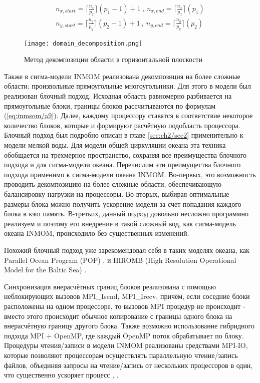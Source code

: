     \begin{equation} \label{eq:inmsom/a9} 
    \begin{array}{c} 
    \displaystyle{ n_{x, start} = \lceil \frac{n_x}{p_x} \rceil (p_1 - 1) + 1 ~,~ n_{x, end} =  \lceil \frac{n_x}{p_x} \rceil (p_1) } \\	
    
    \displaystyle{ n_{y, start} = \lceil \frac{n_y}{p_y} \rceil (p_2 - 1) + 1 ~,~ n_{y, end} =  \lceil \frac{n_y}{p_y} \rceil (p_2) }
    \end{array}
    \end{equation} 
    
	\begin{figure}[htb!]
	\center
	\texttt{[image: domain\_decomposition.png]}
	\caption{Метод декомпозиции области в горизонтальной плоскости}
	\label{fig:ddm3d}
	\end{figure}
        
    Также в сигма-модели INMOM реализована декомпозиция на более сложные области: произвольные прямоугольные многоугольники. 
    Для этого в модели был реализован блочный подход.
    Исходная область равномерно разбивается на прямоугольные блоки, границы блоков рассчитываются по формулам (\ref{eq:inmsom/a9}). 
    Далее, каждому процессору ставятся в соответствие некоторое количество блоков, которые и формируют расчётную подобласть процессора. 
    Блочный подход был подробно описан в главе \ref{sec:ch2/sec2} применительно к модели мелкой воды. Для модели общей циркуляции океана эта техника обобщается на трехмерное пространство, сохраняя все преимущества блочного подхода и для сигма-модели океана. 		
    Перечислим эти преимущества блочного подхода применимо к сигма-модели океана INMOM.
    Во-первых, это возможность проводить декомпозицию на более сложные области, обеспечивающую балансировку нагрузки на процессоры. 
    Во-вторых, выбирая оптимальные размеры блока можно получить ускорение модели за счет попадания каждого блока в кэш память.
    В-третьих, данный подход довольно несложно программно реализуем и поэтому его внедрение в такой сложный код, как сигма-модель океана INMOM, происходило 
    без существенных изменений.

    Похожий блочный подход уже зарекомендовал себя в таких моделях океана, как Parallel Ocean Program (POP) \cite{POP}, \cite{gmd-7-267-2014} и HIROMB (High Resolution Operational Model for the Baltic Sea) \cite{HIROMB}.
    
    Синхронизация внерасчётных границ блоков реализована с помощью неблокирующих вызовов MPI\_Isend, MPI\_Irecv,
    причём, если соседние блоки расположены на одном процессоре, то вызовов MPI процедур не происходит - вместо этого
    происходит обычное копирование с границы одного блока на внерасчётную границу другого блока. 
    Также возможно использование гибридного подхода MPI + OpenMP, где каждый OpenMP поток обрабатывает по блоку.
    Процедуры чтения/записи в модели INMOM реализованы средствами MPI-IO,
    которые позволяют процессорам осуществлять параллельную чтение/запись файлов,
    объединяя запросы на чтение/запись от нескольких процессоров в один,
    что существенно ускоряет процесс \cite{ChaplyginINMOM2017}, \cite{TerehovINMOM2010}.
    
